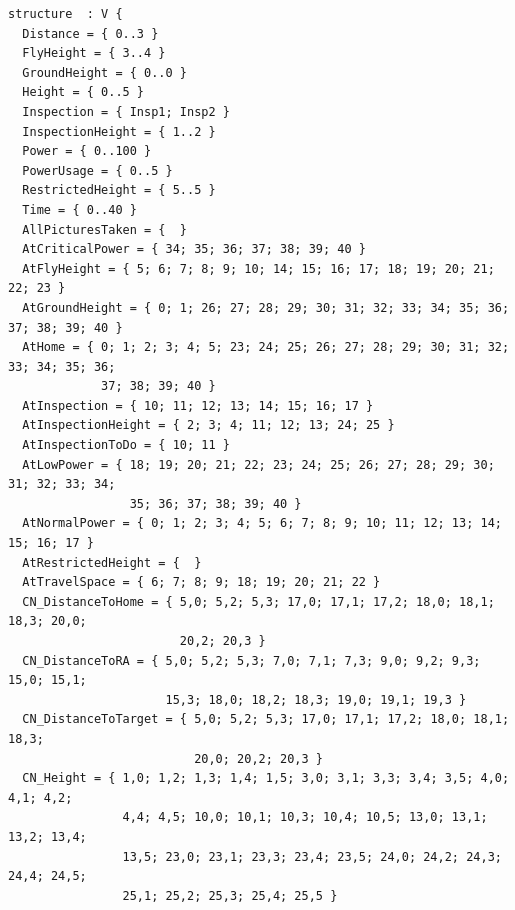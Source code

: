 \documentclass[12pt]{extarticle}
\begin{document}
\begin{lstlisting}[basicstyle=\tiny]
structure  : V {
  Distance = { 0..3 }
  FlyHeight = { 3..4 }
  GroundHeight = { 0..0 }
  Height = { 0..5 }
  Inspection = { Insp1; Insp2 }
  InspectionHeight = { 1..2 }
  Power = { 0..100 }
  PowerUsage = { 0..5 }
  RestrictedHeight = { 5..5 }
  Time = { 0..40 }
  AllPicturesTaken = {  }
  AtCriticalPower = { 34; 35; 36; 37; 38; 39; 40 }
  AtFlyHeight = { 5; 6; 7; 8; 9; 10; 14; 15; 16; 17; 18; 19; 20; 21; 22; 23 }
  AtGroundHeight = { 0; 1; 26; 27; 28; 29; 30; 31; 32; 33; 34; 35; 36; 37; 38; 39; 40 }
  AtHome = { 0; 1; 2; 3; 4; 5; 23; 24; 25; 26; 27; 28; 29; 30; 31; 32; 33; 34; 35; 36;
             37; 38; 39; 40 }
  AtInspection = { 10; 11; 12; 13; 14; 15; 16; 17 }
  AtInspectionHeight = { 2; 3; 4; 11; 12; 13; 24; 25 }
  AtInspectionToDo = { 10; 11 }
  AtLowPower = { 18; 19; 20; 21; 22; 23; 24; 25; 26; 27; 28; 29; 30; 31; 32; 33; 34;
                 35; 36; 37; 38; 39; 40 }
  AtNormalPower = { 0; 1; 2; 3; 4; 5; 6; 7; 8; 9; 10; 11; 12; 13; 14; 15; 16; 17 }
  AtRestrictedHeight = {  }
  AtTravelSpace = { 6; 7; 8; 9; 18; 19; 20; 21; 22 }
  CN_DistanceToHome = { 5,0; 5,2; 5,3; 17,0; 17,1; 17,2; 18,0; 18,1; 18,3; 20,0;
                        20,2; 20,3 }
  CN_DistanceToRA = { 5,0; 5,2; 5,3; 7,0; 7,1; 7,3; 9,0; 9,2; 9,3; 15,0; 15,1;
                      15,3; 18,0; 18,2; 18,3; 19,0; 19,1; 19,3 }
  CN_DistanceToTarget = { 5,0; 5,2; 5,3; 17,0; 17,1; 17,2; 18,0; 18,1; 18,3;
                          20,0; 20,2; 20,3 }
  CN_Height = { 1,0; 1,2; 1,3; 1,4; 1,5; 3,0; 3,1; 3,3; 3,4; 3,5; 4,0; 4,1; 4,2;
                4,4; 4,5; 10,0; 10,1; 10,3; 10,4; 10,5; 13,0; 13,1; 13,2; 13,4;
                13,5; 23,0; 23,1; 23,3; 23,4; 23,5; 24,0; 24,2; 24,3; 24,4; 24,5;
                25,1; 25,2; 25,3; 25,4; 25,5 }
  

\end{lstlisting}
\end{document}
